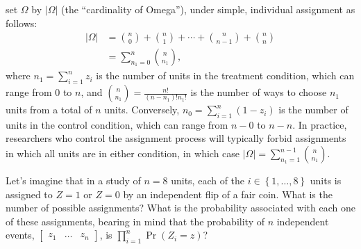 \documentclass[12pt,leqno]{article}
\theoremstyle{newstyle}
\begin{document}
set \(\Omega\) by \(\left\lvert\Omega\right\rvert\) (the ``cardinality
of Omega''), under simple, individual assignment as follows:
\begin{align*}
  \left\lvert\Omega\right\rvert & = \binom{n}{0} + \binom{n}{1} + \cdots + \binom{n}{n-1} + \binom{n}{n} \\ 
              & = \sum \limits_{n_1 = 0}^{n} \binom{n}{n_1},
\end{align*} where \(n_1 = \sum_{i = 1}^n z_i\) is the number of units
in the treatment condition, which can range from \(0\) to \(n\), and
\(\binom{n}{n_1} = \frac{n!}{\left(n - n_1\right)!n_1!}\) is the number
of ways to choose \(n_1\) units from a total of \(n\) units. Conversely,
\(n_0 = \sum_{i = 1}^n \left(1 - z_i\right)\) is the number of units in
the control condition, which can range from \(n - 0\) to \(n - n\). In
practice, researchers who control the assignment process will typically
forbid assignments in which all units are in either condition, in which
case
\(\left\lvert\Omega\right\rvert = \sum \limits_{n_1 = 1}^{n-1} \binom{n}{n_1}\).

\begin{student_exercise}
Let's imagine that in a study of $n = 8$ units, each of the $i \in \left\{1, \ldots , 8\right\}$ units is assigned to $Z = 1$ or $Z = 0$ by an independent flip of a fair coin. What is the number of possible assignments? What is the probability associated with each one of these assignments, bearing in mind that the probability of $n$ independent events, $\begin{bmatrix} z_1 & \ldots & z_n \end{bmatrix}$, is $\prod \limits_{i = 1}^n \Pr\left(Z_i = z\right)$?
\end{student_exercise}
\end{document}
